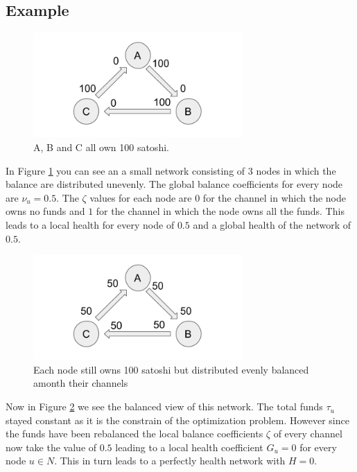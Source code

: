\documentclass[a4paper]{paper}
\begin{document}
\subsection{Example}
\begin{figure}
 \centering
 \includegraphics[width=8cm]{img/evenUnbalanced.png}
 \caption{A, B and C all own 100 satoshi.}
 \label{fig:evenUnbalanced}
\end{figure}
In Figure \ref{fig:evenUnbalanced} you can see an a small network consisting of $3$ nodes in which the balance are distributed unevenly.
The global balance coefficients for every node are $\nu_u=0.5$.
The $\zeta$ values for each node are $0$ for the channel in which the node owns no funds and $1$ for the channel in which the node owns all the funds.
This leads to a local health for every node of $0.5$ and a global health of the network of $0.5$.
\begin{figure}
 \centering
 \includegraphics[width=8cm]{img/evenBalanced.png}
 \caption{Each node still owns 100 satoshi but distributed evenly balanced amonth their channels}
 \label{fig:evenBalanced}
\end{figure}
Now in Figure \ref{fig:evenBalanced} we see the balanced view of this network.
The total funds $\tau_u$ stayed constant as it is the constrain of the optimization problem.
However since the funds have been rebalanced the local balance coefficients $\zeta$ of every channel now take the value of $0.5$ leading to a local health coefficient $G_u=0$ for every node $u\in N$.
This in turn leads to a perfectly health network with $H=0$.
\end{document}
